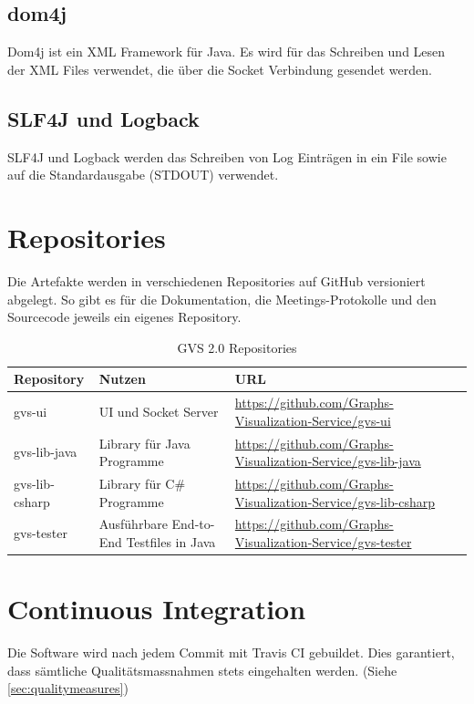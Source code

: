 \documentclass[11pt,a4paper,english,oneside]{book}
\numberwithin{equation}{chapter}
\begin{document}
	\subsection{dom4j}
	Dom4j \cite{dom4j} ist ein XML Framework für Java. Es wird für das Schreiben und Lesen der XML Files verwendet, die über die Socket Verbindung gesendet werden.
	
	\subsection{SLF4J und Logback}
	SLF4J \cite{slf4j} und Logback \cite{logback} werden das Schreiben von Log Einträgen in ein File sowie auf die Standardausgabe (STDOUT) verwendet.
	
		
		
	\section{Repositories}
	Die Artefakte werden in verschiedenen Repositories auf GitHub versioniert abgelegt. So gibt es für die Dokumentation, die Meetings-Protokolle und den Sourcecode jeweils ein eigenes Repository.
	
	\begin{table}[h!]
		\centering
		\begin{tabularx}{\linewidth}{l l X}
			\toprule 
			Repository & Nutzen & URL \\
			\midrule
			gvs-ui & UI und Socket Server & \url{https://github.com/Graphs-Visualization-Service/gvs-ui}  \\
			gvs-lib-java & Library für Java Programme & \url{https://github.com/Graphs-Visualization-Service/gvs-lib-java} \\
			gvs-lib-csharp & Library für C\# Programme & \url{https://github.com/Graphs-Visualization-Service/gvs-lib-csharp} \\
			gvs-tester & Ausführbare End-to-End Testfiles in Java & \url{https://github.com/Graphs-Visualization-Service/gvs-tester} \\
			\bottomrule 
		\end{tabularx} 
		\caption{GVS 2.0 Repositories} 
		\label{tbl:repos}
	\end{table}
	
	\section{Continuous Integration}
	Die Software wird nach jedem Commit mit Travis CI \cite{travisci} gebuildet. Dies garantiert, dass sämtliche Qualitätsmassnahmen stets eingehalten werden. (Siehe \ref{sec:qualitymeasures})
	
\end{document}
